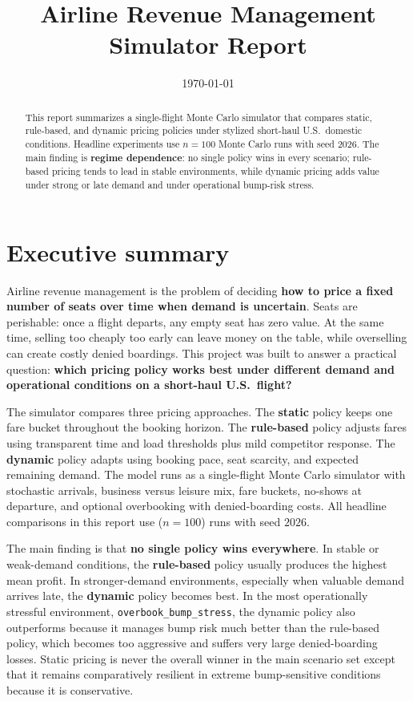 \documentclass[11pt,a4paper]{article}
\title{Airline Revenue Management Simulator Report}
\author{}
\date{\today}
\begin{document}
\maketitle

\begin{abstract}
This report summarizes a single-flight Monte Carlo simulator that compares static, rule-based, and dynamic pricing policies under stylized short-haul U.S.\ domestic conditions. Headline experiments use $n=100$ Monte Carlo runs with seed $2026$. The main finding is \textbf{regime dependence}: no single policy wins in every scenario; rule-based pricing tends to lead in stable environments, while dynamic pricing adds value under strong or late demand and under operational bump-risk stress.
\end{abstract}

\section*{Executive summary}

Airline revenue management is the problem of deciding \textbf{how to price a fixed number of seats over time when demand is uncertain}. Seats are perishable: once a flight departs, any empty seat has zero value. At the same time, selling too cheaply too early can leave money on the table, while overselling can create costly denied boardings. This project was built to answer a practical question: \textbf{which pricing policy works best under different demand and operational conditions on a short-haul U.S.\ flight?}

The simulator compares three pricing approaches. The \textbf{static} policy keeps one fare bucket throughout the booking horizon. The \textbf{rule-based} policy adjusts fares using transparent time and load thresholds plus mild competitor response. The \textbf{dynamic} policy adapts using booking pace, seat scarcity, and expected remaining demand. The model runs as a single-flight Monte Carlo simulator with stochastic arrivals, business versus leisure mix, fare buckets, no-shows at departure, and optional overbooking with denied-boarding costs. All headline comparisons in this report use ($n=100$) runs with seed $2026$.

The main finding is that \textbf{no single policy wins everywhere}. In stable or weak-demand conditions, the \textbf{rule-based} policy usually produces the highest mean profit. In stronger-demand environments, especially when valuable demand arrives late, the \textbf{dynamic} policy becomes best. In the most operationally stressful environment, \texttt{overbook\_bump\_stress}, the dynamic policy also outperforms because it manages bump risk much better than the rule-based policy, which becomes too aggressive and suffers very large denied-boarding losses. Static pricing is never the overall winner in the main scenario set except that it remains comparatively resilient in extreme bump-sensitive conditions because it is conservative.
\end{document}
